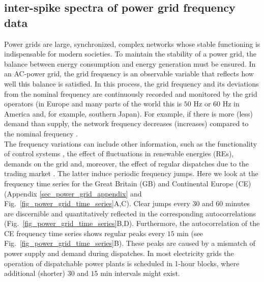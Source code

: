\documentclass[entropy,article,submit,pdftex,moreauthors]{Definitions/mdpi}
\begin{document}
\subsection{inter-spike spectra of power grid frequency data}\label{sec_power_grid}

Power grids are large, synchronized, complex networks whose stable functioning is indispensable for modern societies.
To maintain the stability of a power grid, the balance between energy consumption and energy generation must be ensured. 
In an AC-power grid, the grid frequency is an observable variable that reflects how well this balance is satisfied. 
In this process, the grid frequency and its deviations from the nominal frequency are continuously recorded and monitored by 
the grid operators (in Europe and many parts of the world this is $50$ \si{Hz} or $60$ \si{Hz} in America and, for example, southern Japan).
For example, if there is more (less) demand than supply, the network frequency decreases (increases) compared to the nominal frequency \cite{kundur1994power}.
\\
The frequency variations can include other information, such as the functionality of control systems \cite{gorjao2020data}, the effect of fluctuations in
renewable energies (REs), demands on the grid \cite{anvari2020stochastic} and, moreover, the effect of regular dispatches due to the trading market 
\cite{meyer2020identifying}. The latter induce periodic frequency jumps. Here we look at the frequency time series for the Great Britain (GB) and Continental Europe 
(CE) (Appendix \ref{sec_power_grid_appendix} and Fig.~\ref{fig_power_grid_time_series}A,C). Clear jumps every 30 and 60 minutes are discernible and quantitatively reflected in the corresponding 
autocorrelations (Fig.~\ref{fig_power_grid_time_series}B,D). Furthermore, the autocorrelation of the CE frequency time series shows regular peaks every $15$ \si{min} 
(see Fig.~\ref{fig_power_grid_time_series}B). These peaks are caused by a mismatch of power supply and demand \cite{weissbach2009high} during dispatches. 
In most electricity grids the operation of dispatchable power plants is scheduled in 1-hour blocks, where additional (shorter) $30$ and $15$ \si{min} intervals
might exist.\\
\end{document}
